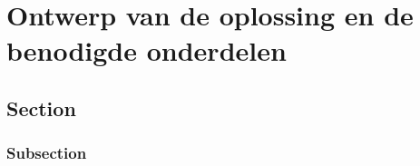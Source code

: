 \chapter{Ontwerp van de oplossing en de benodigde onderdelen}
\label{Ontwerp_van_de_oplossing_en_de_benodigde_onderdelen}

\section{Section}

\subsection{Subsection}

